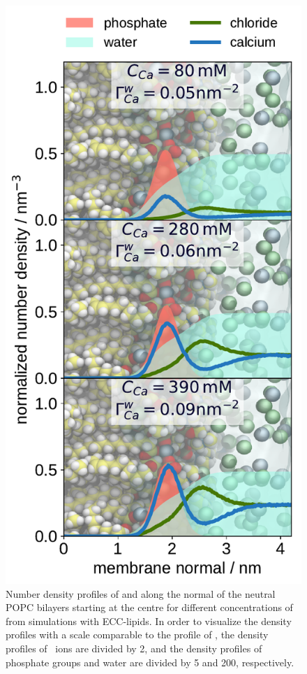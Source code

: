 \documentclass[12pt,a4paper,twoside,openright]{report}
\begin{document}
\begin{figure}[htbp!] 
  \centering 
  \includegraphics[width=\figwidth]{../img/ecc_popc/density_profiles_ca_cl_wat_phos_concentrations-compar.pdf} 
  \caption{\label{fig:cacl-dens} 
    Number density profiles of  and  along the normal of the neutral POPC bilayers starting at the centre 
    for different concentrations of  from simulations with ECC-lipids. 
    In order to visualize the density profiles with a scale comparable to the profile of ,  
    the density profiles of~ ions are divided by 2, and 
    the density profiles of phosphate groups and water are divided by 5 and 200, respectively.  
    } 
\end{figure} 
\end{document}
